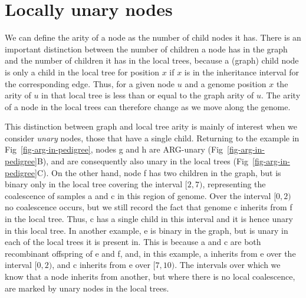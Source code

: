 \documentclass{article}
\newcommand{\noderef}[1]{\textsf{#1}}
\begin{document}
\section*{Locally unary nodes}
We can define the arity of a node as the number of child nodes it has.
There is an
important distinction between the number of children a node has
in the graph and the number of children it has in the local trees,
because a (graph) child node is only a child in the local tree for position
$x$ if $x$ is in the inheritance interval for the corresponding edge.
Thus, for a given node $u$ and a genome position $x$ the arity
of $u$ in that local tree is less than or equal to the graph arity of
$u$. The arity
of a node in the local trees can therefore change as we move along
the genome.

This distinction between graph and local tree arity is mainly
of interest when we consider \emph{unary} nodes, those that have
a single child.
Returning to the example in Fig~\ref{fig-arg-in-pedigree}, nodes
\noderef{g} and \noderef{h} are ARG-unary (Fig~\ref{fig-arg-in-pedigree}B), and are consequently
also unary in the local trees (Fig~\ref{fig-arg-in-pedigree}C).
On the other hand, node \noderef{f} has two children
in the graph, but is binary only
in the local tree covering the interval $[2, 7)$,
representing the coalescence of samples \noderef{a} and \noderef{c}
in this region of genome. Over the interval $[0, 2)$ no coalescence occurs,
but we still record the fact that genome \noderef{c} inherits from \noderef{f}
in the local tree. Thus, \noderef{c} has a single child in this
interval and it is hence unary in this local tree.
In another example, \noderef{e} is binary in the graph, but is
unary in each of the local trees it is present in.
This is because \noderef{a} and \noderef{c} are both recombinant
offspring of \noderef{e} and \noderef{f}, and,
in this example,
\noderef{a} inherits from
\noderef{e} over the interval $[0, 2)$,
and \noderef{c} inherits from \noderef{e} over $[7, 10)$.
The intervals over which
we know that a node inherits from another, but where there
is no local coalescence, are marked by unary nodes in the
local trees.
\end{document}
